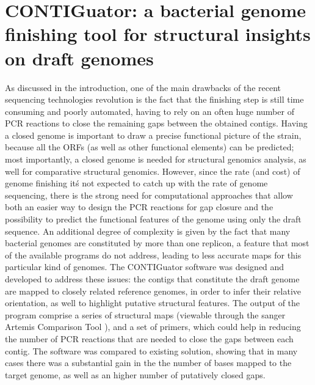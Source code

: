 \newpage
\section{CONTIGuator: a bacterial genome finishing tool for structural insights on draft genomes}
As discussed in the introduction, one of the main drawbacks of the recent sequencing technologies revolution is the fact that the finishing step is still time consuming and poorly automated, having to rely on an often huge number of PCR reactions to close the remaining gaps between the obtained contigs. Having a closed genome is important to draw a precise functional picture of the strain, because all the ORFs (as well as other functional elements) can be predicted; most importantly, a closed genome is needed for structural genomics analysis, as well for comparative structural genomics. However, since the rate (and cost) of genome finishing it\'s not expected to catch up with the rate of genome sequencing, there is the strong need for computational approaches that allow both an easier way to design the PCR reactions for gap closure and the possibility to predict the functional features of the genome using only the draft sequence. An additional degree of complexity is given by the fact that many bacterial genomes are constituted by more than one replicon, a feature that most of the available programs do not address, leading to less accurate maps for this particular kind of genomes. 
The CONTIGuator software was designed and developed to address these issues: the contigs that constitute the draft genome are mapped to closely related reference genomes, in order to infer their relative orientation, as well to highlight putative structural features. The output of the program comprise a series of structural maps (viewable through the sanger Artemis Comparison Tool \cite{carver2005act}), and a set of primers, which could help in reducing the number of PCR reactions that are needed to close the gaps between each contig.
The software was compared to existing solution, showing that in many cases there was a substantial gain in the the number of bases mapped to the target genome, as well as an higher number of putatively closed gaps.
\newpage


\newpage

